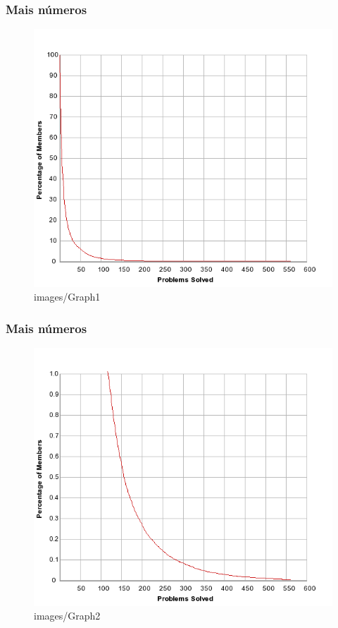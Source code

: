 \documentclass{beamer}
\begin{document}
\begin{frame}
    \frametitle{Mais números}

    \begin{figure}[htpb]
        \centering
        \includegraphics[width=0.8\linewidth]{images/graph1.png}
        \caption{images/Graph1}
        \label{fig:images/graph1}
    \end{figure}
\end{frame}

\begin{frame}
    \frametitle{Mais números}

    \begin{figure}[htpb]
        \centering
        \includegraphics[width=0.8\linewidth]{images/graph2.png}
        \caption{images/Graph2}
        \label{fig:images/graph2}
    \end{figure}
\end{frame}
\end{document}
